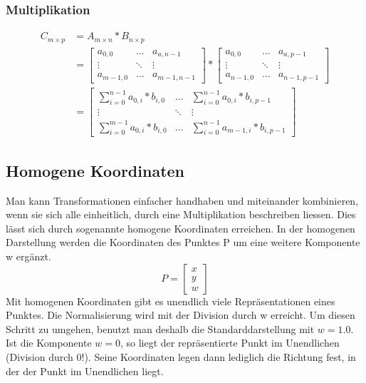 \documentclass[10pt]{article}
\begin{document}
\subsubsection{Multiplikation}
\begin{align}
C_{m \times p} &= A_{m \times n} * B_{n \times p} \\ 
& =
\begin{bmatrix}
a_{0,0} & \dots & a_{a,n-1} \\
\vdots & \ddots & \vdots \\
a_{m-1,0} & \dots & a_{m-1, n-1}
\end{bmatrix} *
\begin{bmatrix}
a_{0,0} & \dots & a_{a,p-1} \\
\vdots & \ddots & \vdots \\
a_{n-1,0} & \dots & a_{n-1, p-1}
\end{bmatrix} \\
& =
\begin{bmatrix}
\sum_{i=0}^{n-1} a_{0,i} * b_{i,0} & \dots & \sum_{i=0}^{n-1} a_{0,i} * b_{i,p-1} \\
\vdots & \ddots & \vdots \\
\sum_{i=0}^{m-1} a_{0,i} * b_{i,0} & \dots & \sum_{i=0}^{n-1} a_{m-1,i} * b_{i,p-1}
\end{bmatrix}
\end{align}

\subsection{Homogene Koordinaten}
Man kann Transformationen einfacher handhaben und miteinander kombinieren, wenn sie sich alle einheitlich, durch eine Multiplikation beschreiben liessen. Dies lässt sich durch sogenannte homogene Koordinaten erreichen. In der homogenen Darstellung werden die Koordinaten des Punktes P um eine weitere Komponente w ergänzt. \\
\begin{equation}
P= \begin{bmatrix}
x \\ y \\ w
\end{bmatrix}
\end{equation}
Mit homogenen Koordinaten gibt es unendlich viele Repräsentationen eines Punktes. Die Normalisierung wird mit der Division durch w erreicht. Um diesen Schritt zu umgehen, benutzt man deshalb die Standarddarstellung mit $w=1.0$. Ist die Komponente $w=0$, so liegt der repräsentierte Punkt im Unendlichen (Division durch 0!). Seine Koordinaten legen dann lediglich die Richtung fest, in der der Punkt im Unendlichen liegt.
\end{document}
